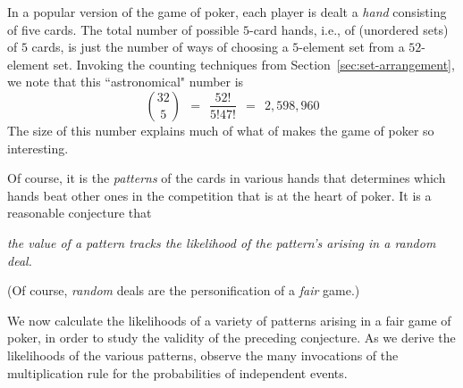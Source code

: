 \medskip


\noindent
In a popular version of the game of poker, each player is dealt a {\it hand} consisting of five cards.  The total number of possible $5$-card hands, i.e., of (unordered sets) of $5$ cards, is just the number of ways of choosing a $5$-element set from a $52$-element set.  Invoking the counting techniques from Section~\ref{sec:set-arrangement}, we note that this ``astronomical" number is
\[
{32 \choose 5} \ \ = \ \ \frac{52!}{5! 47!} \ \ = \ \ 2,598,960 
\]
The size of this number explains much of what of makes the game of poker so interesting.

\medskip

Of course, it is the {\em patterns} of the cards in various hands that determines which hands beat other ones in the competition that is at the heart of poker.  It is a reasonable conjecture that

\smallskip

\noindent
{\em the {\em value} of a pattern tracks the {\em likelihood} of the pattern's arising in a random deal.}

\smallskip

\noindent
(Of course, {\em random} deals are  the personification of a {\em fair} game.)

\bigskip

We now calculate the likelihoods of a variety of patterns arising in a fair game of poker, in order to study the validity of the preceding conjecture.  As we derive the likelihoods of the various patterns, observe the many invocations of the multiplication rule for the probabilities of independent events.

\medskip

